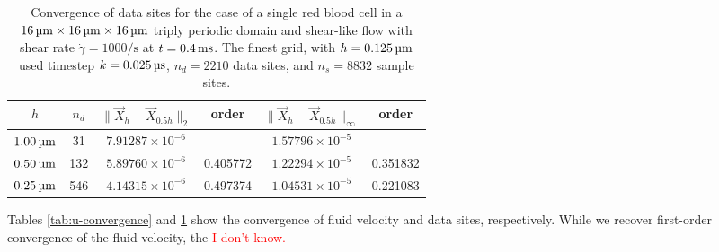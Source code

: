 \begin{table}
    \begin{center}
        \begingroup
        \setlength{\tabcolsep}{9pt}
        \renewcommand{\arraystretch}{1.5}
        \begin{tabular}{cc|cc|cc}
                                                                                                                                 \\ \toprule
            $h$       & $n_d$ & $\|\vec{X}_h-\vec{X}_{0.5h}\|_2$ & order    & $\|\vec{X}_h-\vec{X}_{0.5h}\|_{\infty}$ & order    \\ \midrule
            $1.00\um$ & 31    & $7.91287\times10^{-6}$           &          & $1.57796\times10^{-5}$                  &          \\
            $0.50\um$ & 132   & $5.89760\times10^{-6}$           & 0.405772 & $1.22294\times10^{-5}$                  & 0.351832 \\
            $0.25\um$ & 546   & $4.14315\times10^{-6}$           & 0.497374 & $1.04531\times10^{-5}$                  & 0.221083 \\ \bottomrule
        \end{tabular}
        \endgroup
    \end{center}
    \caption{%
        Convergence of data sites for the case of a single red blood cell in a
        $16\um\times16\um\times16\um$ triply periodic domain and shear-like
        flow with shear rate $\dot{\gamma} = 1000\si{\per\second}$ at
        $t=0.4\ms$. The finest grid, with $h = 0.125\um$ used timestep
        $k=0.025\us$, $n_d=2210$ data sites, and $n_s=8832$ sample sites.
    }
    \label{tab:x-convergence}
\end{table}

Tables \ref{tab:u-convergence} and \ref{tab:x-convergence} show the convergence
of fluid velocity and data sites, respectively. While we recover first-order
convergence of the fluid velocity, the \textcolor{red}{I don't know.}

